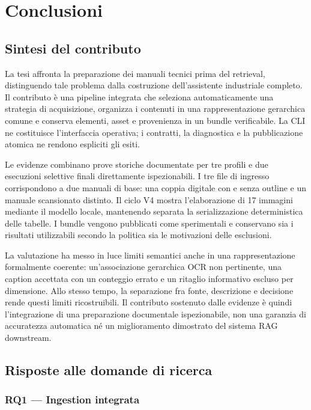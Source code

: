\chapter{Conclusioni}
\label{cap:conclusioni}

\section{Sintesi del contributo}

La tesi affronta la preparazione dei manuali tecnici prima del retrieval, distinguendo tale problema dalla costruzione dell'assistente industriale completo. Il contributo è una pipeline integrata che seleziona automaticamente una strategia di acquisizione, organizza i contenuti in una rappresentazione gerarchica comune e conserva elementi, asset e provenienza in un bundle verificabile. La CLI ne costituisce l'interfaccia operativa; i contratti, la diagnostica e la pubblicazione atomica ne rendono espliciti gli esiti.

Le evidenze combinano prove storiche documentate per tre profili e due esecuzioni selettive finali direttamente ispezionabili. I tre file di ingresso corrispondono a due manuali di base: una coppia digitale con e senza outline e un manuale scansionato distinto. Il ciclo V4 mostra l'elaborazione di 17 immagini mediante il modello locale, mantenendo separata la serializzazione deterministica delle tabelle. I bundle vengono pubblicati come sperimentali e conservano sia i risultati utilizzabili secondo la politica sia le motivazioni delle esclusioni.

La valutazione ha messo in luce limiti semantici anche in una rappresentazione formalmente coerente: un'associazione gerarchica OCR non pertinente, una caption accettata con un conteggio errato e un ritaglio informativo escluso per dimensione. Allo stesso tempo, la separazione fra fonte, descrizione e decisione rende questi limiti ricostruibili. Il contributo sostenuto dalle evidenze è quindi l'integrazione di una preparazione documentale ispezionabile, non una garanzia di accuratezza automatica né un miglioramento dimostrato del sistema RAG downstream.

\section{Risposte alle domande di ricerca}

\subsection{RQ1 --- Ingestion integrata}

